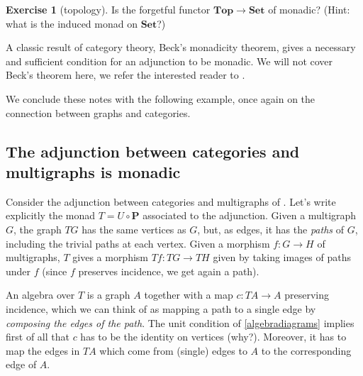 \documentclass[12pt,oneside]{scrbook}
\numberwithin{equation}{section}
\theoremstyle{plain}
\theoremstyle{definition}
\newtheorem{ex}[thm]{Exercise}
\newcommand{\cat}[1]{{\mathbf{#1}}} %
\DeclareMathOperator{\1}{\mathbbm{1}}
\DeclareMathOperator{\2}{\mathbbm{2}}
\begin{document}
\begin{ex}[topology]
 Is the forgetful functor $\cat{Top}\to\cat{Set}$ of  monadic? (Hint: what is the induced monad on $\cat{Set}$?)
\end{ex}



A classic result of category theory, Beck's monadicity theorem, gives a necessary and sufficient condition for an adjunction to be monadic. We will not cover Beck's theorem here, we refer the interested reader to \cite[Chapter~5]{ctcontext}. 

We conclude these notes with the following example, once again on the connection between graphs and categories.

\subsection{The adjunction between categories and multigraphs is monadic}\label{catgraphmonadic}

Consider the adjunction between categories and multigraphs of .
 Let's write explicitly the monad $T=U\circ\cat{P}$ associated to the adjunction. 
 Given a multigraph $G$, the graph $TG$ has the same vertices as $G$, but, as edges, it has the \emph{paths} of $G$, including the trivial paths at each vertex. Given a morphism $f:G\to H$ of multigraphs, $T$ gives a morphism $Tf:TG\to TH$ given by taking images of paths under $f$ (since $f$ preserves incidence, we get again a path). 
 
 An algebra over $T$ is a graph $A$ together with a map $c:TA\to A$ preserving incidence, which we can think of as mapping a path to a single edge by \emph{composing the edges of the path}. The unit condition of \eqref{algebradiagrams} implies first of all that $c$ has to be the identity on vertices (why?). Moreover, it has to map the edges in $TA$ which come from (single) edges to $A$ to the corresponding edge of $A$.
 
\end{document}
